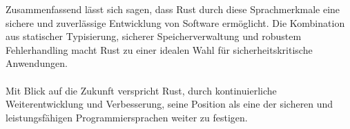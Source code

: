 \noindent
Zusammenfassend lässt sich sagen, dass Rust durch diese Sprachmerkmale eine sichere und zuverlässige Entwicklung von Software ermöglicht. 
Die Kombination aus statischer Typisierung, sicherer Speicherverwaltung und robustem Fehlerhandling macht Rust zu einer idealen Wahl für sicherheitskritische Anwendungen. \\
\\
Mit Blick auf die Zukunft verspricht Rust, durch kontinuierliche Weiterentwicklung und Verbesserung, seine Position als eine der sicheren und leistungsfähigen Programmiersprachen weiter zu festigen.

